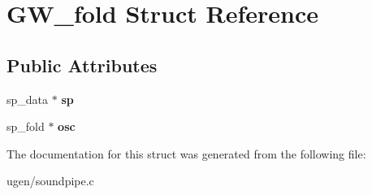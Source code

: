 \hypertarget{structGW__fold}{}\section{G\+W\+\_\+fold Struct Reference}
\label{structGW__fold}
\subsection*{Public Attributes}
\begin{DoxyCompactItemize}
\item 
\hypertarget{structGW__fold_a73893b29de84ddc45860ce88938cb015}{}\label{structGW__fold_a73893b29de84ddc45860ce88938cb015} 
sp\+\_\+data $\ast$ {\bfseries sp}
\item 
\hypertarget{structGW__fold_a25e62dd1136ebcba614a48ae78de023e}{}\label{structGW__fold_a25e62dd1136ebcba614a48ae78de023e} 
sp\+\_\+fold $\ast$ {\bfseries osc}
\end{DoxyCompactItemize}


The documentation for this struct was generated from the following file\+:\begin{DoxyCompactItemize}
\item 
ugen/soundpipe.\+c\end{DoxyCompactItemize}
